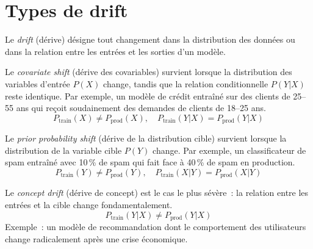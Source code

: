\section{Types de drift}
\label{sec:drift-types}

Le \emph{drift} (d\'erive) d\'esigne tout changement dans la distribution des donn\'ees ou dans la relation entre les entr\'ees et les sorties d'un mod\`ele.

\begin{definition}
Le \emph{covariate shift} (d\'erive des covariables) survient lorsque la distribution des variables d'entr\'ee $P(X)$ change, tandis que la relation conditionnelle $P(Y|X)$ reste identique. Par exemple, un mod\`ele de cr\'edit entra\^in\'e sur des clients de 25--55 ans qui re\c{c}oit soudainement des demandes de clients de 18--25 ans.
\[
P_{\text{train}}(X) \neq P_{\text{prod}}(X), \quad P_{\text{train}}(Y|X) = P_{\text{prod}}(Y|X)
\]
\end{definition}

\begin{definition}
Le \emph{prior probability shift} (d\'erive de la distribution cible) survient lorsque la distribution de la variable cible $P(Y)$ change. Par exemple, un classificateur de spam entra\^in\'e avec 10\,\% de spam qui fait face \`a 40\,\% de spam en production.
\[
P_{\text{train}}(Y) \neq P_{\text{prod}}(Y), \quad P_{\text{train}}(X|Y) = P_{\text{prod}}(X|Y)
\]
\end{definition}

\begin{definition}
Le \emph{concept drift} (d\'erive de concept) est le cas le plus s\'ev\`ere~: la relation entre les entr\'ees et la cible change fondamentalement.
\[
P_{\text{train}}(Y|X) \neq P_{\text{prod}}(Y|X)
\]
Exemple~: un mod\`ele de recommandation dont le comportement des utilisateurs change radicalement apr\`es une crise \'economique.
\end{definition}


